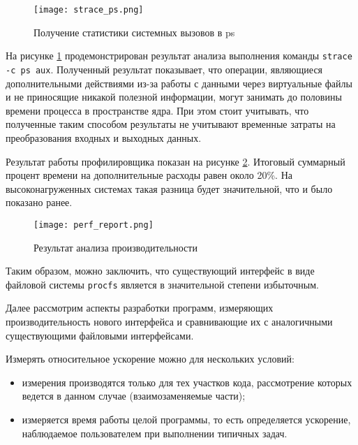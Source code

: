 \begin{figure}
  \centering
  \texttt{[image: strace\_ps.png]}
  \caption{Получение статистики системных вызовов в ps}
  \label{fig:strace_ps}
\end{figure}

На рисунке \ref{fig:strace_ps}
продемонстрирован результат анализа выполнения команды
\texttt{strace -c ps aux}. Полученный результат
показывает, что операции, являющиеся дополнительными действиями из-за работы с
данными через виртуальные файлы и не приносящие никакой полезной информации,
могут занимать до половины времени процесса в пространстве ядра. При этом стоит
учитывать, что полученные таким способом результаты не учитывают временные
затраты на преобразования входных и выходных данных.

Результат работы профилировщика показан на рисунке \ref{fig:perf_report}.
Итоговый суммарный процент времени на дополнительные расходы равен около 20\%.
На высоконагруженных системах такая разница будет значительной, что и было
показано ранее.

\begin{figure}
  \centering
  \texttt{[image: perf\_report.png]}
  \caption{Результат анализа производительности}
  \label{fig:perf_report}
\end{figure}

Таким образом, можно заключить, что существующий интерфейс в виде файловой
системы \texttt{procfs} является в значительной степени избыточным.

Далее рассмотрим аспекты разработки программ, измеряющих производительность
нового интерфейса и сравнивающие их с аналогичными существующими файловыми
интерфейсами.

Измерять относительное ускорение можно для нескольких условий:
\begin{itemize}
\item измерения производятся только для тех участков кода, рассмотрение которых
  ведется в данном случае (взаимозаменяемые части);
\item измеряется время работы целой программы, то есть определяется ускорение,
  наблюдаемое пользователем при выполнении типичных задач.
\end{itemize}

